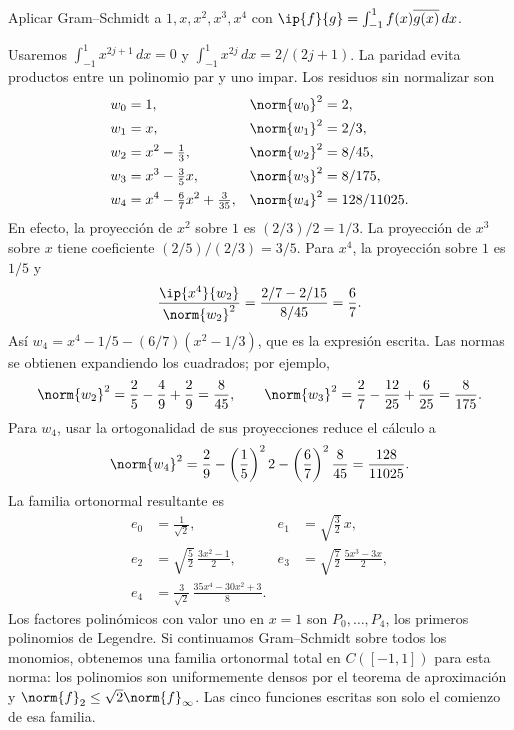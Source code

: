 \begin{ejercicio}
Aplicar Gram--Schmidt a $1,x,x^{2},x^{3},x^{4}$ con $\ip{f}{g}=\int_{-1}^{1}f(x)\overline{g(x)}\,dx$.
\end{ejercicio}
\begin{solucion}
Usaremos $\int_{-1}^{1}x^{2j+1}\,dx=0$ y $\int_{-1}^{1}x^{2j}\,dx=2/(2j+1)$. La paridad evita productos entre un polinomio par y uno impar. Los residuos sin normalizar son
\begin{align*}
 w_0&=1, &\norm{w_0}^{2}&=2,\\
 w_1&=x, &\norm{w_1}^{2}&=2/3,\\
 w_2&=x^{2}-\tfrac13, &\norm{w_2}^{2}&=8/45,\\
 w_3&=x^{3}-\tfrac35x, &\norm{w_3}^{2}&=8/175,\\
 w_4&=x^{4}-\tfrac67x^{2}+\tfrac3{35}, &\norm{w_4}^{2}&=128/11025.
\end{align*}
En efecto, la proyección de $x^{2}$ sobre $1$ es $(2/3)/2=1/3$. La proyección de $x^{3}$ sobre $x$ tiene coeficiente $(2/5)/(2/3)=3/5$. Para $x^{4}$, la proyección sobre $1$ es $1/5$ y
\[
 \frac{\ip{x^{4}}{w_2}}{\norm{w_2}^{2}}
 =\frac{2/7-2/15}{8/45}=\frac67.
\]
Así $w_4=x^{4}-1/5-(6/7)(x^{2}-1/3)$, que es la expresión escrita. Las normas se obtienen expandiendo los cuadrados; por ejemplo,
\[
 \norm{w_2}^{2}=\frac25-\frac49+\frac29=\frac8{45},\qquad
 \norm{w_3}^{2}=\frac27-\frac{12}{25}+\frac6{25}=\frac8{175}.
\]
Para $w_4$, usar la ortogonalidad de sus proyecciones reduce el cálculo a
\[
 \norm{w_4}^{2}=\frac29-\left(\frac15\right)^2 2
 -\left(\frac67\right)^2\frac8{45}=\frac{128}{11025}.
\]
La familia ortonormal resultante es
\begin{align*}
 e_0&=\frac1{\sqrt2}, &
 e_1&=\sqrt{\frac32}\,x,\\
 e_2&=\sqrt{\frac52}\,\frac{3x^{2}-1}{2}, &
 e_3&=\sqrt{\frac72}\,\frac{5x^{3}-3x}{2},\\
 e_4&=\frac3{\sqrt2}\,\frac{35x^{4}-30x^{2}+3}{8}.
\end{align*}
Los factores polinómicos con valor uno en $x=1$ son $P_0,\dots,P_4$, los primeros polinomios de Legendre. Si continuamos Gram--Schmidt sobre todos los monomios, obtenemos una familia ortonormal total en $C([-1,1])$ para esta norma: los polinomios son uniformemente densos por el teorema de aproximación y $\norm{f}_2\leq\sqrt2\norm{f}_\infty$. Las cinco funciones escritas son solo el comienzo de esa familia.
\end{solucion}


